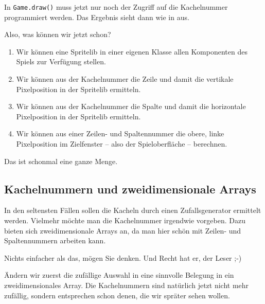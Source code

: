 
In \texttt{Game.draw()} muss jetzt nur noch der Zugriff auf die Kachelnummer programmiert werden. Das Ergebnis sieht dann wie in  aus.




Also, was können wir jetzt schon?
\begin{enumerate}
	\item Wir können eine Spritelib in einer eigenen Klasse allen Komponenten des Spiels zur Verfügung stellen.
	\item Wir können aus der Kachelnummer die Zeile und damit die vertikale Pixelposition in der Spritelib ermitteln.
	\item Wir können aus der Kachelnummer die Spalte und damit die horizontale Pixelposition in der Spritelib ermitteln.
	\item Wir können aus einer Zeilen- und Spaltennummer die obere, linke Pixelposition im Zielfenster -- also der Spieloberfläche -- berechnen.
\end{enumerate}

Das ist schonmal eine ganze Menge. 

\subsection{Kachelnummern und zweidimensionale Arrays}

In den seltensten Fällen sollen die Kacheln durch einen Zufallsgenerator ermittelt werden. Vielmehr möchte man die Kachelnummer irgendwie vorgeben. Dazu bieten sich zweidimensionale Arrays an, da man hier schön mit Zeilen- und Spaltennummern arbeiten kann.

Nichts einfacher als das, mögen Sie denken. Und Recht hat er, der Leser ;-)

Ändern wir zuerst die zufällige Auswahl in eine sinnvolle Belegung in ein zweidimensionales Array. Die Kachelnummern sind natürlich jetzt nicht mehr zufällig, sondern entsprechen schon denen, die wir spräter sehen wollen. 


